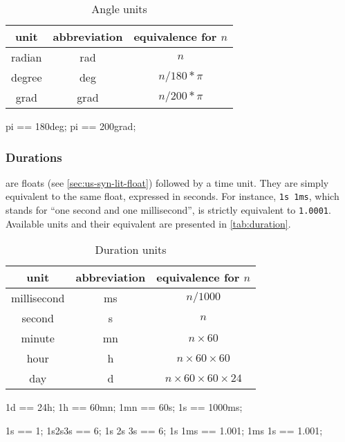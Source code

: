 \begin{table}[\floatposh]
  \centering
  \begin{tabular}{|c|c|c|}
    \hline
    unit        & abbreviation & equivalence for $n$  \\
    \hline
    radian      & rad          & $n$         \\
    degree      & deg          & $n / 180 * \pi$        \\
    grad        & grad         & $n / 200 * \pi$        \\
    \hline
  \end{tabular}
  \caption{Angle units}
  \label{tab:angle}
\end{table}

\begin{urbiassert}[firstnumber=last]
pi == 180deg;
pi == 200grad;
\end{urbiassert}

\subsubsection{Durations}

 are floats (see \autoref{sec:us-syn-lit-float})
followed by a time unit. They are simply equivalent to the same float,
expressed in seconds. For instance, \lstinline|1s 1ms|, which stands
for ``one second and one millisecond'', is strictly equivalent to
\lstinline|1.0001|. Available units and their equivalent are presented
in \autoref{tab:duration}.

\begin{table}
  \centering
  \begin{tabular}{|c|c|c|}
    \hline
    unit        & abbreviation & equivalence for $n$  \\
    \hline
    millisecond & ms           & $n / 1000$         \\
    second      & s            & $n$                \\
    minute      & mn           & $n \times 60$           \\
    hour        & h            & $n \times 60 \times 60$      \\
    day         & d            & $n \times 60 \times 60 \times 24$ \\
    \hline
  \end{tabular}
  \caption{Duration units}
  \label{tab:duration}
\end{table}

\begin{urbiassert}[firstnumber=last]
1d == 24h;
1h == 60mn;
1mn == 60s;
1s == 1000ms;

1s == 1;
1s2s3s == 6;
1s 2s 3s == 6;
1s 1ms == 1.001;
1ms 1s == 1.001;
\end{urbiassert}

